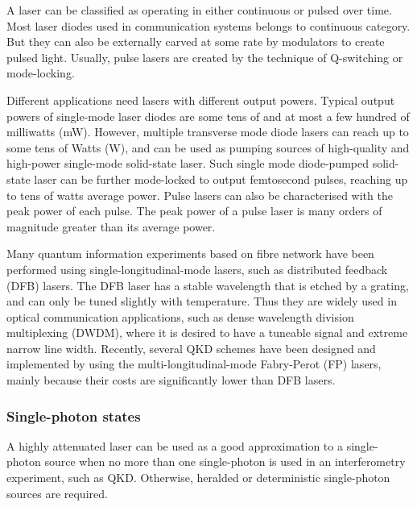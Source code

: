 \documentclass[aps, rmp, twocolumn, amsmath, amssymb, nofootinbib, superscriptaddress, longbibliography, floatfix, table-of-contents, eqsecnum]{revtex4-1}
\begin{document}
A laser can be classified as operating in either continuous or pulsed over time. Most laser diodes used in communication systems belongs to continuous category. But they can also be externally carved at some rate by modulators to create pulsed light. Usually, pulse lasers are created by the technique of Q-switching or mode-locking.

Different applications need lasers with different output powers. Typical output powers of single-mode laser diodes are some tens of and at most a few hundred of milliwatts (mW). However, multiple transverse mode diode lasers can reach up to some tens of Watts (W), and can be used as pumping sources of high-quality and high-power single-mode solid-state laser. Such single mode diode-pumped solid-state laser can be further mode-locked to output femtosecond pulses, reaching up to tens of watts average power. Pulse lasers can also be characterised with the peak power of each pulse. The peak power of a pulse laser is many orders of magnitude greater than its average power.

Many quantum information experiments based on fibre network \cite{sun2016quantum} have been performed using single-longitudinal-mode lasers, such as distributed feedback (DFB) lasers. The DFB laser has a stable wavelength that is etched by a grating, and can only be tuned slightly with temperature. Thus they are widely used in optical communication applications, such as dense wavelength division multiplexing (DWDM), where it is desired to have a tuneable signal and extreme narrow line width. Recently, several QKD schemes \cite{choi2011quantum, wang2015experimental} have been designed and implemented by using the multi-longitudinal-mode Fabry-Perot (FP) lasers, mainly because their costs are significantly lower than DFB lasers.

%
%

\subsubsection{Single-photon states} 

A highly attenuated laser can be used as a good approximation to a single-photon source when no more than one single-photon is used in an interferometry experiment, such as QKD. Otherwise, heralded or deterministic single-photon sources are required.
\end{document}

